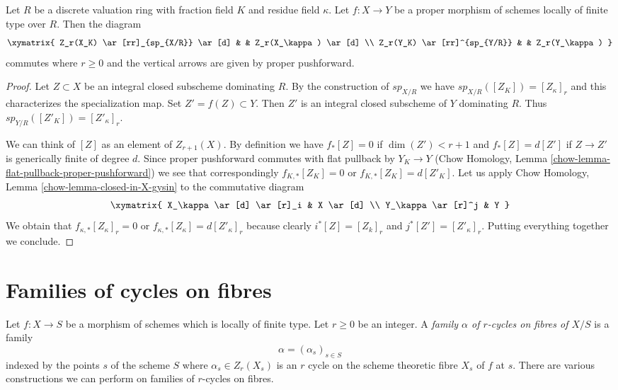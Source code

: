 \begin{lemma}
\label{lemma-specialization-proper-pushforward}
Let $R$ be a discrete valuation ring with fraction field $K$ and residue field
$\kappa$. Let $f : X \to Y$ be a proper morphism of schemes locally of
finite type over $R$. Then the diagram
$$
\xymatrix{
Z_r(X_K) \ar[rr]_{sp_{X/R}} \ar[d] & & Z_r(X_\kappa) \ar[d] \\
Z_r(Y_K) \ar[rr]^{sp_{Y/R}} & & Z_r(Y_\kappa)
}
$$
commutes where $r \geq 0$ and the vertical arrows are given
by proper pushforward.
\end{lemma}

\begin{proof}
Let $Z \subset X$ be an integral closed subscheme dominating $R$.
By the construction of $sp_{X/R}$ we have $sp_{X/R}([Z_K]) = [Z_\kappa]_r$
and this characterizes the specialization map.
Set $Z' = f(Z) \subset Y$. Then $Z'$ is an integral closed subscheme
of $Y$ dominating $R$. Thus $sp_{Y/R}([Z'_K]) = [Z'_\kappa]_r$.

\medskip\noindent
We can think of $[Z]$ as an element of $Z_{r + 1}(X)$. By definition
we have $f_*[Z] = 0$ if $\dim(Z') < r + 1$ and $f_*[Z] = d[Z']$
if $Z \to Z'$ is generically finite of degree $d$.
Since proper pushforward commutes with flat pullback by $Y_K \to Y$
(Chow Homology, Lemma \ref{chow-lemma-flat-pullback-proper-pushforward})
we see that correspondingly $f_{K, *}[Z_K] = 0$ or $f_{K, *}[Z_K] = d[Z'_K]$.
Let us apply Chow Homology, Lemma \ref{chow-lemma-closed-in-X-gysin} to
the commutative diagram
$$
\xymatrix{
X_\kappa \ar[d] \ar[r]_i & X \ar[d] \\
Y_\kappa \ar[r]^j & Y
}
$$
We obtain that $f_{\kappa, *}[Z_\kappa]_r = 0$ or
$f_{\kappa, *}[Z_\kappa] = d[Z'_\kappa]_r$ because
clearly $i^*[Z] = [Z_k]_r$ and $j^*[Z'] = [Z'_\kappa]_r$.
Putting everything together we conclude.
\end{proof}









\section{Families of cycles on fibres}
\label{section-cycles-fibres}

\noindent
Let $f : X \to S$ be a morphism of schemes which is locally of finite type.
Let $r \geq 0$ be an integer. A
{\it family $\alpha$ of $r$-cycles on fibres of $X/S$} is a family
$$
\alpha = (\alpha_s)_{s \in S}
$$
indexed by the points $s$ of the scheme $S$ where $\alpha_s \in Z_r(X_s)$
is an $r$ cycle on the scheme theoretic fibre $X_s$ of $f$ at $s$.
There are various constructions we can perform on families of
$r$-cycles on fibres.

